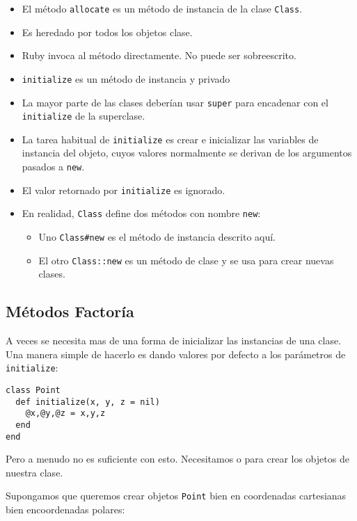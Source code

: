 \begin{itemize}
\item
El método \verb|allocate| es un método de instancia de la clase \verb|Class|.
\item
Es heredado por todos los objetos clase. 
\item
Ruby invoca al
método directamente.
No puede ser sobreescrito. 
\end{itemize}

\begin{itemize}
\item \verb|initialize| es un método de instancia y privado
\item La mayor parte de las clases deberían usar \verb|super|
para encadenar con el \verb|initialize| de la superclase.
\item La tarea habitual de \verb|initialize| es crear e inicializar
las variables de instancia del objeto, cuyos valores normalmente 
se derivan de los argumentos pasados a \verb|new|.
\item El valor retornado por \verb|initialize| es ignorado.
\item
En realidad, \verb|Class| define dos métodos con nombre \verb|new|:
\begin{itemize}
\item
Uno \verb|Class#new| es el método de instancia descrito aquí.
\item
El otro \verb|Class::new| es un método de clase y se usa para crear nuevas clases.
\end{itemize}
\end{itemize}


\subsection{Métodos Factoría}

A veces se necesita mas de una forma de inicializar las instancias
de una clase.
Una manera simple de hacerlo es dando valores por defecto a los 
parámetros de \verb|initialize|:

\begin{verbatim}
class Point
  def initialize(x, y, z = nil)
    @x,@y,@z = x,y,z
  end
end
\end{verbatim}
Pero a menudo no es suficiente con esto. Necesitamos  o
para crear los objetos de nuestra clase.

Supongamos que queremos crear objetos \verb|Point|
bien en coordenadas cartesianas
bien encoordenadas  polares:

